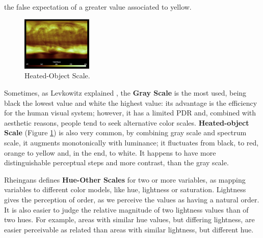 the false expectation of a greater value associated to yellow. \par
%
\begin{figure}
	\centering
    \vspace{-10pt}
    \includegraphics[width=0.3\textwidth]{images/background/HeatedObjectScale.png}
    \caption[Heated-Object Scale Example]{Heated-Object Scale. \protect\cite{Rheingans2000}}
    \label{fig:heatedobject}
\end{figure}
%
Sometimes, as Levkowitz explained \cite{Levkowitz1996}, the \textbf{Gray Scale} is the most used,
being black the lowest value and white the highest value: its advantage is the efficiency for the human
visual system; however, it has a limited PDR and, combined with aesthetic reasons, people tend to seek
alternative color scales. \textbf{Heated-object Scale} (Figure \ref{fig:heatedobject}) is also very
common, by combining gray scale and
spectrum scale, it augments monotonically with luminance; it fluctuates from black, to red, orange to yellow
and, in the end, to white. It happens to have more distinguishable perceptual steps and more contrast, than
the gray scale. \par
%
Rheingans \cite{Rheingans2000} defines \textbf{Hue-Other Scales} for two or more variables, as mapping variables to
different color models, like hue, lightness or saturation. Lightness
gives the perception of order, as we perceive the values as having a natural order. It is also easier to
judge the relative magnitude of two lightness values than of two hues. For example, areas with similar hue
values, but differing lightness, are easier perceivable as related than areas with similar lightness, but
different hue.
%
